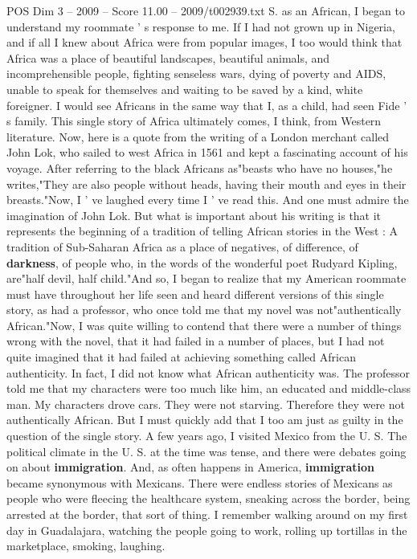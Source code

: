 \begin{textsample}{POS Dim 3 – 2009 – Score 11.00 – 2009/t002939.txt}
S. as an African, I began to understand my roommate ' s response to me.
If I had not grown up in Nigeria, and if all I knew about Africa were from popular images, I too would think that Africa was a place of beautiful landscapes, beautiful animals, and incomprehensible people, fighting senseless wars, dying of poverty and AIDS, unable to speak for themselves and waiting to be saved by a kind, white foreigner.
I would see Africans in the same way that I, as a child, had seen Fide ' s family.
This single story of Africa ultimately comes, I think, from Western literature.
Now, here is a quote from the writing of a London merchant called John Lok, who sailed to west Africa in 1561 and kept a fascinating account of his voyage.
After referring to the black Africans as"beasts who have no houses,"he writes,"They are also people without heads, having their mouth and eyes in their breasts."Now, I ' ve laughed every time I ' ve read this.
And one must admire the imagination of John Lok.
But what is important about his writing is that it represents the beginning of a tradition of telling African stories in the West : A tradition of Sub-Saharan Africa as a place of negatives, of difference, of \textbf{darkness}, of people who, in the words of the wonderful poet Rudyard Kipling, are"half devil, half child."And so, I began to realize that my American roommate must have throughout her life seen and heard different versions of this single story, as had a professor, who once told me that my novel was not"authentically African."Now, I was quite willing to contend that there were a number of things wrong with the novel, that it had failed in a number of places, but I had not quite imagined that it had failed at achieving something called African authenticity.
In fact, I did not know what African authenticity was.
The professor told me that my characters were too much like him, an educated and middle-class man.
My characters drove cars.
They were not starving.
Therefore they were not authentically African.
But I must quickly add that I too am just as guilty in the question of the single story.
A few years ago, I visited Mexico from the U.
S.
The political climate in the U.
S. at the time was tense, and there were debates going on about \textbf{immigration}.
And, as often happens in America, \textbf{immigration} became synonymous with Mexicans.
There were endless stories of Mexicans as people who were fleecing the healthcare system, sneaking across the border, being arrested at the border, that sort of thing.
I remember walking around on my first day in Guadalajara, watching the people going to work, rolling up tortillas in the marketplace, smoking, laughing.

\end{textsample}

